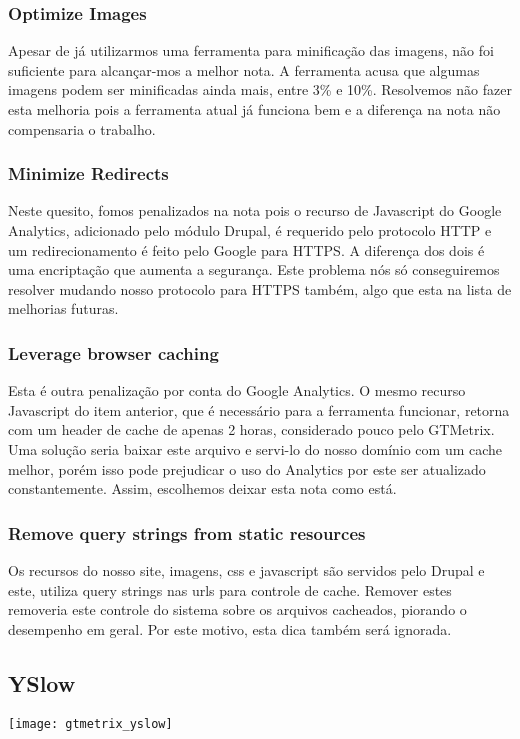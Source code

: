 \documentclass[
	12pt,				%
    oneside,			%
	a4paper,			%
	english,			%
	french,				%
	spanish,			%
	brazil				%
	]{abntex2}
\begin{document}
\subsubsection{Optimize Images}
Apesar de já utilizarmos uma ferramenta para minificação das imagens, não foi suficiente para alcançar-mos a melhor nota. A ferramenta acusa que algumas imagens podem ser minificadas ainda mais, entre 3\% e 10\%. Resolvemos não fazer esta melhoria pois a ferramenta atual já funciona bem e a diferença na nota não compensaria o trabalho.

\subsubsection{Minimize Redirects}
Neste quesito, fomos penalizados na nota pois o recurso de Javascript do Google Analytics, adicionado pelo módulo Drupal, é requerido pelo protocolo HTTP e um redirecionamento é feito pelo Google para HTTPS. A diferença dos dois é uma encriptação que aumenta a segurança. Este problema nós só conseguiremos resolver mudando nosso protocolo para HTTPS também, algo que esta na lista de melhorias futuras.

\subsubsection{Leverage browser caching}
Esta é outra penalização por conta do Google Analytics. O mesmo recurso Javascript do item anterior, que é necessário para a ferramenta funcionar, retorna com um header de cache de apenas 2 horas, considerado pouco pelo GTMetrix. Uma solução seria baixar este arquivo e servi-lo do nosso domínio com um cache melhor, porém isso pode prejudicar o uso do Analytics por este ser atualizado constantemente. Assim, escolhemos deixar esta nota como está.

\subsubsection{Remove query strings from static resources}
Os recursos do nosso site, imagens, css e javascript são servidos pelo Drupal e este, utiliza query strings nas urls para controle de cache. Remover estes removeria este controle do sistema sobre os arquivos cacheados, piorando o desempenho em geral. Por este motivo, esta dica também será ignorada.

\subsection{YSlow}
\texttt{[image: gtmetrix\_yslow]}
\end{document}
